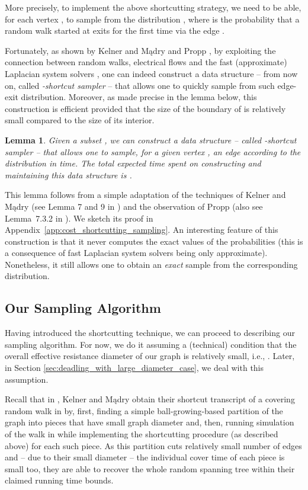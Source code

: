 \documentclass[11pt, letterpaper]{article}
\newtheorem{lemma}[theorem]{Lemma}
\begin{document}
More precisely, to implement the above shortcutting strategy, we need to be able, for each vertex , to sample from the distribution , where  is the probability that a random walk started at  exits  for the first time via the edge . 


Fortunately, as shown by Kelner and Mądry \cite{KelnerM09} and Propp \cite{Propp10}, by exploiting the connection between random walks, electrical flows and the fast (approximate) Laplacian system solvers \cite{SpielmanT03,SpielmanT04,KoutisMP10,KoutisMP11,KelnerOSZ13}, one can indeed construct a data structure -- from now on, called {\em -shortcut sampler} -- that allows one to quickly sample from such edge-exit distribution. Moreover, as made precise in the lemma below, this construction is efficient provided that the size of the boundary of  is relatively small compared to the size of its interior. 

\begin{lemma}\label{lem:cost_shortcutting_sampling}
Given a subset , we can construct a data structure -- called {\em -shortcut sampler} -- that allows one to sample, for a given vertex , an edge  according to the distribution  in  time. The total expected time spent on constructing and maintaining this data structure is .
\end{lemma}
This lemma follows from a simple adaptation of the techniques of Kelner and Mądry (see Lemma 7 and 9 in \cite{KelnerM09}) and the observation of Propp \cite{Propp10} (also see Lemma~7.3.2 in \cite{Madry11}). We sketch its proof in Appendix~\ref{app:cost_shortcutting_sampling}. An interesting feature of this construction is that it never computes the exact values of the probabilities  (this is a consequence of fast Laplacian system solvers being only approximate). Nonetheless, it still allows one to obtain an {\em exact} sample from the corresponding distribution.

\subsection{Our Sampling Algorithm}

Having introduced the shortcutting technique, we can proceed to describing our sampling algorithm. For now, we do it assuming a (technical) condition that the overall effective resistance diameter  of our graph is relatively small, i.e., . Later, in Section \ref{sec:deadling_with_large_diameter_case}, we deal with this assumption. 

Recall that in \cite{KelnerM09}, Kelner and Mądry obtain their shortcut transcript of a covering random walk in  by, first, finding a simple ball-growing-based partition of the graph into pieces that have small graph diameter and, then, running simulation of the walk in  while implementing the shortcutting procedure (as described above) for each such piece. As this partition cuts relatively small number of edges and -- due to their small diameter -- the individual cover time of each piece is small too, they are able to recover the whole random spanning tree within their claimed running time bounds. 
\end{document}
